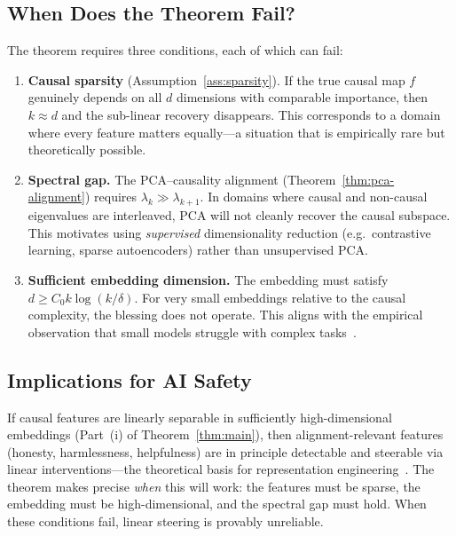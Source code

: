 \documentclass[11pt,a4paper]{article}
\theoremstyle{plain}
\theoremstyle{definition}
\theoremstyle{remark}
\begin{document}
\subsection{When Does the Theorem Fail?}\label{sec:limitations}

The theorem requires three conditions, each of which can fail:

\begin{enumerate}[leftmargin=2em,itemsep=3pt]
  \item \textbf{Causal sparsity} (Assumption~\ref{ass:sparsity}).  If the true
    causal map $f$ genuinely depends on all $d$ dimensions with comparable
    importance, then $k \approx d$ and the sub-linear recovery disappears.  This
    corresponds to a domain where every feature matters equally---a situation that
    is empirically rare but theoretically possible.

  \item \textbf{Spectral gap.}  The PCA--causality alignment
    (Theorem~\ref{thm:pca-alignment}) requires $\lambda_k \gg \lambda_{k+1}$.
    In domains where causal and non-causal eigenvalues are interleaved, PCA will
    not cleanly recover the causal subspace.  This motivates using
    \emph{supervised} dimensionality reduction (e.g.\ contrastive learning,
    sparse autoencoders) rather than unsupervised PCA.

  \item \textbf{Sufficient embedding dimension.}  The embedding must satisfy
    $d \geq C_0 k\log(k/\delta)$.  For very small embeddings relative to the
    causal complexity, the blessing does not operate.  This aligns with the
    empirical observation that small models struggle with complex
    tasks~\citep{kaplan2020scaling}.
\end{enumerate}

\subsection{Implications for AI Safety}\label{sec:safety}

If causal features are linearly separable in sufficiently high-dimensional
embeddings (Part~(i) of Theorem~\ref{thm:main}), then alignment-relevant
features (honesty, harmlessness, helpfulness) are in principle detectable and
steerable via linear interventions---the theoretical basis for representation
engineering~\citep{zou2023representation}.  The theorem makes precise \emph{when}
this will work: the features must be sparse, the embedding must be
high-dimensional, and the spectral gap must hold.  When these conditions fail,
linear steering is provably unreliable.
\end{document}
